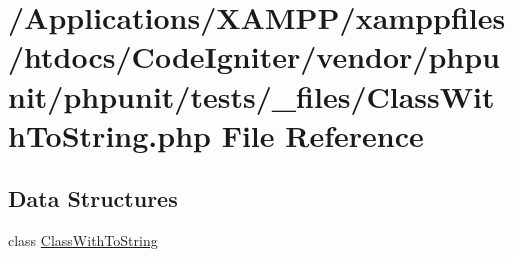 \hypertarget{phpunit_2phpunit_2tests_2__files_2_class_with_to_string_8php}{}\section{/\+Applications/\+X\+A\+M\+P\+P/xamppfiles/htdocs/\+Code\+Igniter/vendor/phpunit/phpunit/tests/\+\_\+files/\+Class\+With\+To\+String.php File Reference}
\label{phpunit_2phpunit_2tests_2__files_2_class_with_to_string_8php}
\subsection*{Data Structures}
\begin{DoxyCompactItemize}
\item 
class \mbox{\hyperlink{class_class_with_to_string}{Class\+With\+To\+String}}
\end{DoxyCompactItemize}
